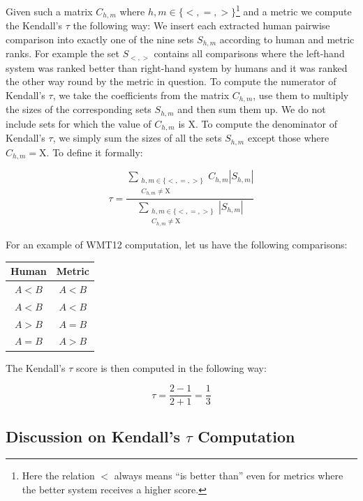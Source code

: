 Given such a matrix $C_{h,m}$ where $h,m \in \{<,=,>\}$\footnote{Here
the relation $<$ always means ``is better than'' even for metrics
where the better system receives a higher score.} and a metric we compute the
Kendall's $\tau$ the following way:
We insert each extracted human pairwise comparison into exactly one of the nine
sets $S_{h,m}$ according to human and metric ranks. For example the set
$S_{<,>}$ contains all comparisons where the left-hand system was ranked better
than right-hand system by humans and it was ranked the other way round by the
metric in question.
To compute the numerator of Kendall's $\tau$, we take the coefficients from the matrix
$C_{h,m}$, use them to multiply the sizes of the corresponding sets $S_{h,m}$ and
then sum them up. We do not include sets for which the value of $C_{h,m}$ is X.
To compute the denominator of Kendall's $\tau$, we simply sum the sizes of all
the sets
$S_{h,m}$ except those where $C_{h,m} = \text{X}$. To define it formally:

\begin{equation*}
    \tau = \frac{
        \sum\limits_{\substack{
            h,m \in \{<,=,>\} \\
            C_{h,m} \ne \text{X}
        }}
        C_{h,m} |S_{h,m}|
    }{
        \sum\limits_{\substack{
            h,m \in \{<,=,>\} \\
            C_{h,m} \ne \text{X}
        }}
        |S_{h,m}|
    }
\end{equation*}

For an example of WMT12 computation, let us have the following comparisons:
\begin{center}
\begin{tabular}{cc}
  Human & Metric \\
  \hline
  $A < B$ & $A < B$ \\
  $A < B$ & $A < B$ \\
  $A > B$ & $A = B$ \\
  $A = B$ & $A > B$ \\
\end{tabular}
\end{center}

\noindent The Kendall's $\tau$ score is then computed in the following way:

\begin{equation*}
  \tau = \frac{2-1}{2+1} = \frac{1}{3}
\end{equation*}

\subsection{Discussion on Kendall's $\tau{}$ Computation}

